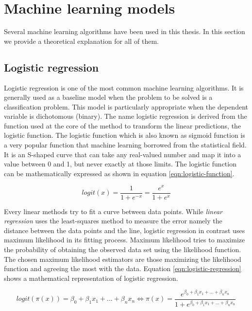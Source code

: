 \documentclass[LaM,binding=0.6cm, english]{sapthesis}
\begin{document}
\section{Machine learning models}

Several machine learning algorithms have been used in this thesis. In this section we provide a theoretical explanation for all of them.

\subsection{Logistic regression} \label{lr_model}

Logistic regression is one of the most common machine learning algorithms. It is generally used as a baseline model when the problem to be solved is a classification problem. This model is particularly appropriate when the dependent variable is dichotomous (binary).\cite{Sahar2018} The name logistic regression is derived from the function used at the core of the method to transform the linear predictions, the logistic function. The logistic function which is also known as sigmoid function is a very popular function that machine learning borrowed from the statistical field. It is an S-shaped curve that can take any real-valued number and map it into a value between 0 and 1, but never exactly at those limits. The logistic function can be mathematically expressed as shown in equation \ref{eqn:logistic-function}.

\begin{equation}
\label{eqn:logistic-function}
logit(x) = \frac{1}{1 + e^{-x}} = \frac{e^x}{1 + e^x}
\end{equation}

\par Every linear methods try to fit a curve between data points. While \textit{linear regression} uses the least-squares method to measure the error namely the distance between the data points and the line, logistic regression in contrast uses maximum likelihood in its fitting process. Maximum likelihood tries to maximize the probability of obtaining the observed data set using the likelihood function. The chosen maximum likelihood estimators are those maximizing the likelihood function and agreeing the most with the data. Equation \ref{eqn:logistic-regression} shows a mathematical representation of logistic regression.

\begin{equation}
\label{eqn:logistic-regression}
logit(\pi(x)) = \beta_0 + \beta_1x_1 + ... + \beta_nx_n \Longleftrightarrow \pi(x) = \frac{e^{\beta_0 + \beta_1x_1 + ... + \beta_nx_n}}{1 + e^{\beta_0 + \beta_1x_1 + ... + \beta_nx_n}}
\end{equation}
\end{document}
